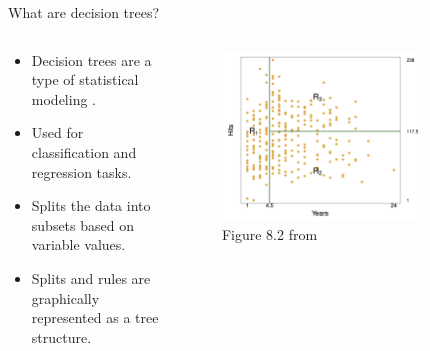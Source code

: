 \documentclass[professionalfonts]{beamer}
\begin{document}
\begin{frame}{What are decision trees?}
  \begin{columns}
    \begin{column}{0.40\linewidth}
      \begin{itemize}
        \item Decision trees are a type of statistical modeling \citep{breimanClassificationRegressionTrees1986}.
        \item Used for classification and regression tasks.
        \item Splits the data into subsets based on variable values.
        \item Splits and rules are graphically represented as a tree structure.
      \end{itemize}
    \end{column}
    \begin{column}{0.60\linewidth}
      \begin{figure}
        \centering
        \includegraphics[width=0.8\textwidth]{images/decisiontreespace.png}
        \caption{Figure 8.2 from \citet{jamesIntroductionStatisticalLearning2021}}
      \end{figure}
    \end{column}
  \end{columns}
\end{frame}
\end{document}
